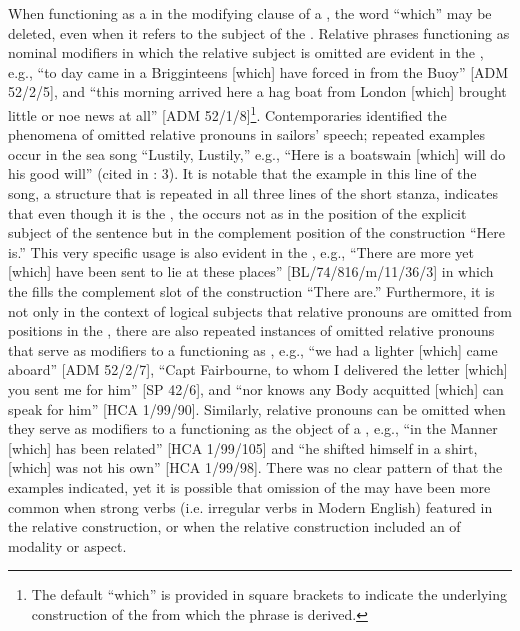 When functioning as a  in the modifying clause of a , the word “which” may be deleted, even when it refers to the subject of the . Relative phrases functioning as nominal modifiers in which the relative subject  is omitted are evident in the , e.g., “to day came in a Brigginteens [which] have forced in from the Buoy” [ADM 52/2/5], and “this morning arrived here a hag boat from London [which] brought little or noe news at all” [ADM 52/1/8]\footnote{The default  “which” is provided in square brackets to indicate the underlying construction of the  from which the phrase is derived.}. Contemporaries identified the phenomena of omitted relative pronouns in sailors’ speech; repeated examples occur in the sea song “Lustily, Lustily,” e.g., “Here is a boatswain [which] will do his good will” (cited in \citealt{Palmer1986}: 3). It is notable that the example in this line of the song, a structure that is repeated in all three lines of the short stanza, indicates that even though it is the , the  occurs not as in the position of the explicit subject of the sentence but in the complement position of the  construction “Here is.” This very specific usage is also evident in the , e.g., “There are more yet [which] have been sent to lie at these places” [BL/74/816/m/11/36/3] in which the  fills the complement slot of the  construction “There are.” Furthermore, it is not only in the context of logical subjects that relative pronouns are omitted from positions in the , there are also repeated instances of omitted relative pronouns that serve as modifiers to a  functioning as , e.g., “we had a lighter [which] came aboard” [ADM 52/2/7], “Capt Fairbourne, to whom I delivered the letter [which] you sent me for him” [SP 42/6], and “nor knows any Body acquitted [which] can speak for him” [HCA 1/99/90]. Similarly, relative pronouns can be omitted when they serve as modifiers to a  functioning as the object of a , e.g., “in the Manner [which] has been related” [HCA 1/99/105] and “he shifted himself in a shirt, [which] was not his own” [HCA 1/99/98]. There was no clear pattern of  that the  examples indicated, yet it is possible that omission of the  may have been more common when strong verbs (i.e. irregular verbs in Modern English) featured in the relative construction, or when the relative construction included an  of modality or aspect. 

